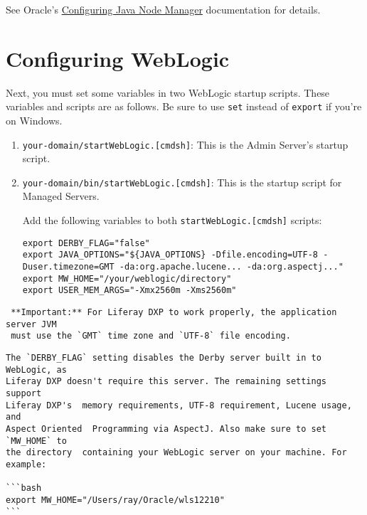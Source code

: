 \noindent\hrulefill

See Oracle's
\href{https://docs.oracle.com/middleware/1212/wls/NODEM/java_nodemgr.htm\#NODEM173}{Configuring
Java Node Manager} documentation for details.

\section{Configuring WebLogic}\label{configuring-weblogic}

Next, you must set some variables in two WebLogic startup scripts. These
variables and scripts are as follows. Be sure to use \texttt{set}
instead of \texttt{export} if you're on Windows.

\begin{enumerate}
\def\labelenumi{\arabic{enumi}.}
\item
  \texttt{your-domain/startWebLogic.{[}cmd\textbar{}sh{]}}: This is the
  Admin Server's startup script.
\item
  \texttt{your-domain/bin/startWebLogic.{[}cmd\textbar{}sh{]}}: This is
  the startup script for Managed Servers.

  Add the following variables to both
  \texttt{startWebLogic.{[}cmd\textbar{}sh{]}} scripts:

\begin{verbatim}
export DERBY_FLAG="false"
export JAVA_OPTIONS="${JAVA_OPTIONS} -Dfile.encoding=UTF-8 -Duser.timezone=GMT -da:org.apache.lucene... -da:org.aspectj..."
export MW_HOME="/your/weblogic/directory"
export USER_MEM_ARGS="-Xmx2560m -Xms2560m"
\end{verbatim}
\end{enumerate}

\noindent\hrulefill

\begin{verbatim}
 **Important:** For Liferay DXP to work properly, the application server JVM
 must use the `GMT` time zone and `UTF-8` file encoding.
\end{verbatim}

\noindent\hrulefill

\begin{verbatim}
The `DERBY_FLAG` setting disables the Derby server built in to WebLogic, as
Liferay DXP doesn't require this server. The remaining settings support
Liferay DXP's  memory requirements, UTF-8 requirement, Lucene usage, and
Aspect Oriented  Programming via AspectJ. Also make sure to set `MW_HOME` to
the directory  containing your WebLogic server on your machine. For example:

```bash
export MW_HOME="/Users/ray/Oracle/wls12210"
```
\end{verbatim}


